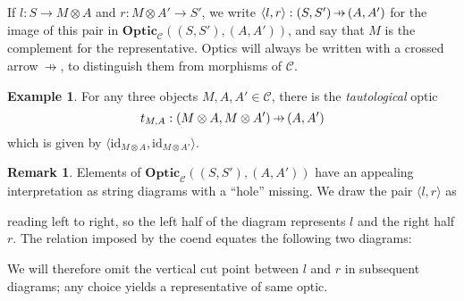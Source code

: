 \documentclass[11pt,a4paper]{article}
\theoremstyle{plain}
\theoremstyle{definition}
\newtheorem{example}[theorem]{Example}
\newtheorem{remark}[theorem]{Remark}
\newcommand{\C}{\mathscr{C}}
\newcommand{\Optic}{\mathbf{Optic}}
\newcommand{\id}{\mathrm{id}}
\newcommand{\hto}{\ensuremath{\,\mathaccent\shortmid\rightarrow\,}}
\begin{document}
If $l : S \to M \otimes A$ and $r : M \otimes A' \to S'$, we write $\langle l, r \rangle : (S, S') \hto (A, A')$ for the image of this pair in $\Optic_\C((S, S'), (A, A'))$, and say that $M$ is the complement for the representative. Optics will always be written with a crossed arrow $\hto$, to distinguish them from morphisms of $\C$.

\begin{example}
For any three objects $M, A, A' \in \C$, there is the \emph{tautological} optic \[t_{M,A} : (M \otimes A, M \otimes A') \hto (A, A')\] which is given by $\langle \id_{M \otimes A}, \id_{M \otimes A'} \rangle$.
\end{example}

\begin{remark}
Elements of $\Optic_\C((S, S'), (A, A'))$ have an appealing interpretation as string diagrams with a ``hole'' missing. We draw the pair $\langle l, r \rangle$ as
\begin{center}

\end{center}
reading left to right, so the left half of the diagram represents $l$ and the right half $r$. The relation imposed by the coend equates the following two diagrams:
\begin{center}
 
\qquad

\end{center}
We will therefore omit the vertical cut point between $l$ and $r$ in subsequent diagrams; any choice yields a representative of same optic.
\end{remark}
\end{document}
